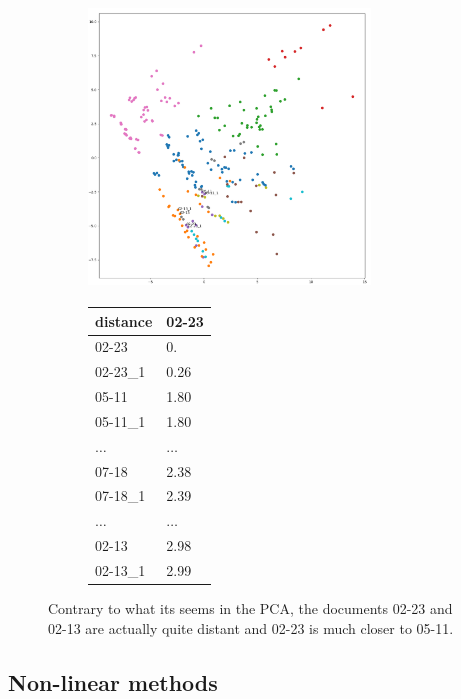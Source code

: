 \documentclass[a4paper,11pt]{article}
\begin{document}
\begin{figure}
\begin{subfigure}{0.6\textwidth}
\includegraphics[width=7.5cm, height=7.5cm, keepaspectratio]{./img/acp_1}
\end{subfigure}
\begin{subfigure}{0.4\textwidth}
\begin{tabular}{|l|l|}
\hline
distance & 02-23 \\
\hline
02-23	& 0.\\
02-23\_1	& 0.26\\
05-11	& 1.80\\
05-11\_1	& 1.80\\
$\ldots$	& $\ldots$\\
07-18	& 2.38\\
07-18\_1	& 2.39\\
$\ldots$	& $\ldots$\\
02-13	& 2.98\\
02-13\_1	& 2.99\\
\hline

\end{tabular}
\end{subfigure}
\caption{Contrary to what its seems in the PCA, the documents 02-23 and 02-13 are actually quite distant and 02-23 is much closer to 05-11.}
\label{fig:acp_pb}
\end{figure}

\subsection*{Non-linear methods}
\end{document}
